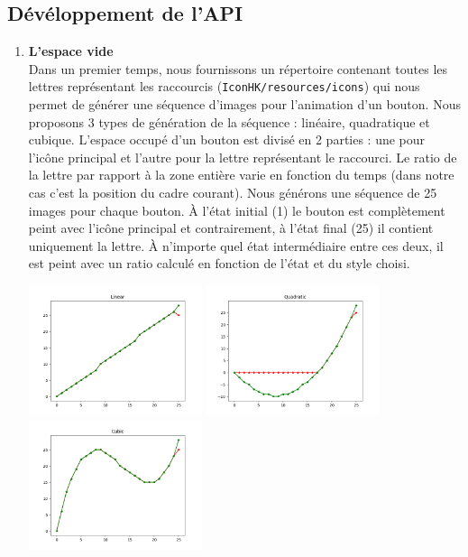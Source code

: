 \documentclass[12pt,a4paper]{article}
\begin{document}
\subsection{Dévéloppement de l'API}
\begin{enumerate}
\item {\large \textbf{L'espace vide}}\\
Dans un premier temps, nous fournissons un répertoire contenant toutes les lettres représentant les raccourcis (\texttt{IconHK/resources/icons}) qui nous permet de générer une séquence d'images pour l'animation d'un bouton. Nous proposons 3 types de génération de la séquence : linéaire, quadratique et cubique. L'espace occupé d'un bouton est divisé en 2 parties : une pour l'icône principal et l'autre pour la lettre représentant le raccourci. Le ratio de la lettre par rapport à la zone entière varie en fonction du temps (dans notre cas c'est la position du cadre courant). Nous générons une séquence de 25 images pour chaque bouton. À l'état initial (1) le bouton est complètement peint avec l'icône principal et contrairement, à l'état final (25) il contient uniquement la lettre. À n'importe quel état intermédiaire entre ces deux, il est peint avec un ratio calculé en fonction de l'état et du style choisi.
\begin{center}
	\includegraphics[width=0.4\textwidth]{linear.png}
	\includegraphics[width=0.4\textwidth]{quadratic.png}
	\includegraphics[width=0.4\textwidth]{cubic.png}

\end{center}
\end{enumerate}
\end{document}
